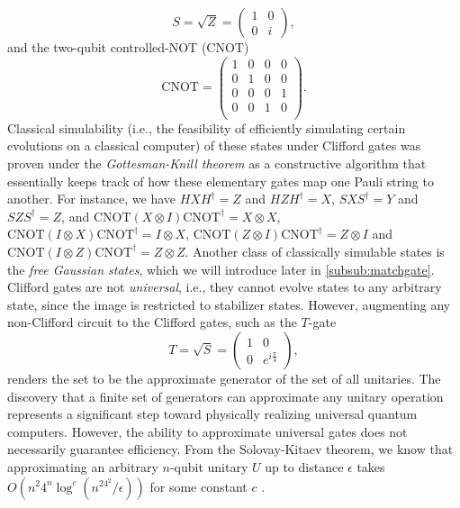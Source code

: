 \documentclass[../main.tex]{subfiles}
\begin{document}
\begin{equation}
    S = \sqrt{Z} =
    \begin{pmatrix}
        1 & 0 \\
        0 & i
    \end{pmatrix},
\end{equation} and the two-qubit controlled-NOT ($\mathrm{CNOT}$)
\begin{equation}
    \mathrm{CNOT} = 
    \begin{pmatrix}
        1 & 0 & 0 & 0 \\
        0 & 1 & 0 & 0 \\
        0 & 0 & 0 & 1 \\
        0 & 0 & 1 & 0 \\
    \end{pmatrix}.
\end{equation} Classical simulability (i.e., the feasibility of efficiently simulating certain evolutions on a classical computer) of these states under Clifford gates was proven under the \textit{Gottesman-Knill theorem} \cite{aaronson2004improved} as a constructive algorithm that essentially keeps track of how these elementary gates map one Pauli string to another. For instance, we have $HXH^\dagger = Z$ and $HZH^\dagger = X$, $SXS^\dagger = Y$ and $SZS^\dagger = Z$, and $\mathrm{CNOT} (X \otimes I) \mathrm{CNOT}^\dagger = X \otimes X$, $\mathrm{CNOT} (I \otimes X) \mathrm{CNOT}^\dagger = I \otimes X$, $\mathrm{CNOT} (Z \otimes I) \mathrm{CNOT}^\dagger = Z \otimes I$ and $\mathrm{CNOT} (I \otimes Z) \mathrm{CNOT}^\dagger = Z \otimes Z$.  Another class of classically simulable states is the \textit{free Gaussian states}, which we will introduce later in \ref{subsub:matchgate}. Clifford gates are not \textit{universal}, i.e., they cannot evolve states to any arbitrary state, since the image is restricted to stabilizer states. However, augmenting any non-Clifford circuit to the Clifford gates, such as the $T$-gate
\begin{equation}
    T = \sqrt{S} = \begin{pmatrix}
        1 & 0 \\
        0 & e^{i \frac{\pi}{4}}
    \end{pmatrix},
\end{equation} renders the set to be the approximate generator of the set of all unitaries. The discovery that a finite set of generators can approximate any unitary operation represents a significant step toward physically realizing universal quantum computers.
 However, the ability to approximate universal gates does not necessarily guarantee efficiency. From the Solovay-Kitaev theorem, we know that approximating an arbitrary $n$-qubit unitary $U$ up to distance $\epsilon$ takes $O(n^2 4^n \log^c(n^24^2/\epsilon))$ for some constant $c$ \cite{nielsen2010quantum}. 
 
\end{document}
